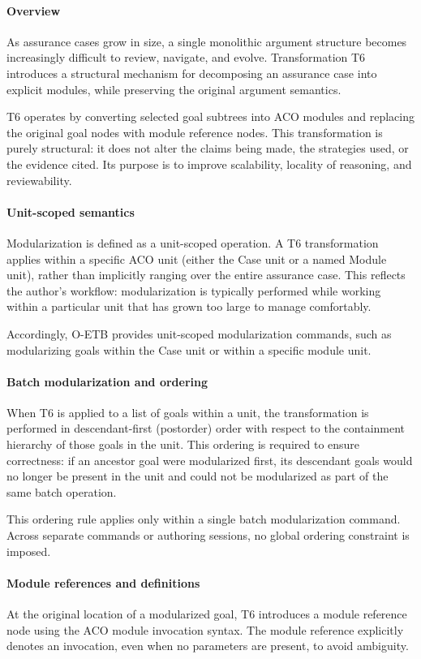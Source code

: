 \documentclass[12pt,twoside,a4paper]{article}
\begin{document}
\paragraph{Overview}
As assurance cases grow in size, a single monolithic argument structure becomes increasingly difficult to review, navigate, and evolve. Transformation T6 introduces a structural mechanism for decomposing an assurance case into explicit modules, while preserving the original argument semantics.

T6 operates by converting selected goal subtrees into ACO modules and replacing the original goal nodes with module reference nodes. This transformation is purely structural: it does not alter the claims being made, the strategies used, or the evidence cited. Its purpose is to improve scalability, locality of reasoning, and reviewability.

\paragraph{Unit-scoped semantics}
Modularization is defined as a unit-scoped operation. A T6 transformation applies within a specific ACO unit (either the Case unit or a named Module unit), rather than implicitly ranging over the entire assurance case. This reflects the author’s workflow: modularization is typically performed while working within a particular unit that has grown too large to manage comfortably.

Accordingly, O-ETB provides unit-scoped modularization commands, such as modularizing goals within the Case unit or within a specific module unit.

\paragraph{Batch modularization and ordering}
When T6 is applied to a list of goals within a unit, the transformation is performed in descendant-first (postorder) order with respect to the containment hierarchy of those goals in the unit. This ordering is required to ensure correctness: if an ancestor goal were modularized first, its descendant goals would no longer be present in the unit and could not be modularized as part of the same batch operation.

This ordering rule applies only within a single batch modularization command. Across separate commands or authoring sessions, no global ordering constraint is imposed.

\paragraph{Module references and definitions}
At the original location of a modularized goal, T6 introduces a module reference node using the ACO module invocation syntax. The module reference explicitly denotes an invocation, even when no parameters are present, to avoid ambiguity.
\end{document}
